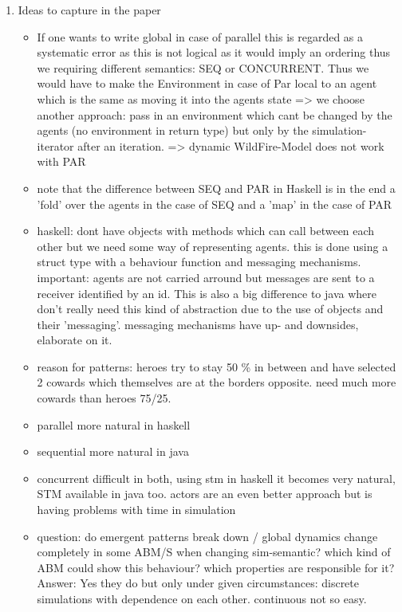 \begin{enumerate}
\item Ideas to capture in the paper
	\begin{itemize}
		\item If one wants to write global in case of parallel this is regarded as a systematic error as this is not logical as it would imply an ordering thus we requiring different semantics: SEQ or CONCURRENT. Thus we would have to make the Environment in case of Par local to an agent which is the same as moving it into the agents state => we choose another approach: pass in an environment which cant be changed by the agents (no environment in return type) but only by the simulation-iterator after an iteration.  => dynamic WildFire-Model does not work with PAR
		\item note that the difference between SEQ and PAR in Haskell is in the end a 'fold' over the agents in the case of SEQ and a 'map' in the case of PAR
		\item haskell: dont have objects with methods which can call between each other but we need some way of representing agents. this is done using a struct type with a behaviour function and messaging mechanisms. important: agents are not carried arround but messages are sent to a receiver identified by an id. This is also a big difference to java where don't really need this kind of abstraction due to the use of objects and their 'messaging'. messaging mechanisms have up- and downsides, elaborate on it.

		\item reason for patterns: heroes try to stay 50 \% in between and have selected 2 cowards which themselves are at the borders opposite. need much more cowards than heroes 75/25.
		
		\item parallel more natural in haskell
		\item sequential more natural in java
		\item concurrent difficult in both, using stm in haskell it becomes very natural, STM available in java too. actors are an even better approach but is having problems with time in simulation
		
		\item question: do emergent patterns break down / global dynamics change completely in some ABM/S when changing sim-semantic? which kind of ABM could show this behaviour? which properties are responsible for it? Answer: Yes they do but only under given circumstances: discrete simulations with dependence on each other. continuous not so easy. 
		

\end{itemize}
\end{enumerate}
